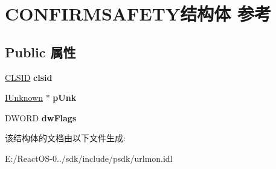 \hypertarget{struct_c_o_n_f_i_r_m_s_a_f_e_t_y}{}\section{C\+O\+N\+F\+I\+R\+M\+S\+A\+F\+E\+T\+Y结构体 参考}
\label{struct_c_o_n_f_i_r_m_s_a_f_e_t_y}
\subsection*{Public 属性}
\begin{DoxyCompactItemize}
\item 
\mbox{\label{struct_c_o_n_f_i_r_m_s_a_f_e_t_y_adcaa366f74fb8bcc8213629aca8f693c}} 
\hyperlink{struct___i_i_d}{C\+L\+S\+ID} {\bfseries clsid}
\item 
\mbox{\label{struct_c_o_n_f_i_r_m_s_a_f_e_t_y_a1499ded3a1f0d0614b565718282226b3}} 
\hyperlink{interface_i_unknown}{I\+Unknown} $\ast$ {\bfseries p\+Unk}
\item 
\mbox{\label{struct_c_o_n_f_i_r_m_s_a_f_e_t_y_ab4cf8971b244e6a1c746b85251fd0563}} 
D\+W\+O\+RD {\bfseries dw\+Flags}
\end{DoxyCompactItemize}


该结构体的文档由以下文件生成\+:\begin{DoxyCompactItemize}
\item 
E\+:/\+React\+O\+S-\/0../sdk/include/psdk/urlmon.\+idl\end{DoxyCompactItemize}
